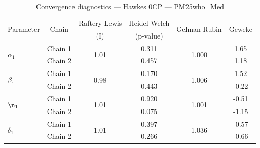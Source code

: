 \begin{table}[H]
\centering
\caption{Convergence diagnostics — Hawkes 0CP — PM25who_Med}
\begin{tabular}{lccccc}
\toprule
\multirow{2}{*}{Parameter} & \multirow{2}{*}{Chain} & Raftery-Lewis & Heidel-Welch & \multirow{2}{*}{Gelman-Rubin} & \multirow{2}{*}{Geweke} \\
 & & (I) & (p-value) & & (z) \\
\midrule
\multirow{2}{*}{$\alpha_1$} & Chain 1 & \multirow{2}{*}{1.01} & 0.311 & \multirow{2}{*}{1.000} & 1.65 \\
 & Chain 2 & & 0.457 & & 1.18 \\
\midrule
\multirow{2}{*}{$\beta_1$} & Chain 1 & \multirow{2}{*}{0.98} & 0.170 & \multirow{2}{*}{1.006} & 1.52 \\
 & Chain 2 & & 0.443 & & -0.22 \\
\midrule
\multirow{2}{*}{$\n_1$} & Chain 1 & \multirow{2}{*}{1.01} & 0.920 & \multirow{2}{*}{1.001} & -0.51 \\
 & Chain 2 & & 0.075 & & -1.15 \\
\midrule
\multirow{2}{*}{$\delta_1$} & Chain 1 & \multirow{2}{*}{1.01} & 0.397 & \multirow{2}{*}{1.036} & -0.57 \\
 & Chain 2 & & 0.266 & & -0.66 \\
\bottomrule
\end{tabular}
\end{table}
